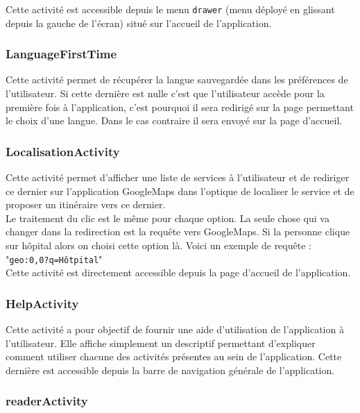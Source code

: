	Cette activité est accessible depuis le menu \texttt{drawer} (menu déployé en glissant depuis la gauche de l'écran) situé sur l'accueil de l'application.

\subsubsection{LanguageFirstTime}

	Cette activité permet de récupérer la langue sauvegardée dans les préférences de l'utilisateur. Si cette dernière est nulle c'est que l'utilisateur accède pour la première fois à l'application, c'est pourquoi il sera redirigé sur la page permettant le choix d'une langue. Dans le cas contraire il sera envoyé sur la page d'accueil.

\subsubsection{LocalisationActivity}
	
	Cette activité permet d'afficher une liste de services à l'utilisateur et de rediriger ce dernier sur l'application GoogleMaps dans l'optique de localiser le service et de proposer un itinéraire vers ce dernier.
	\\
	
	Le traitement du clic est le même pour chaque option. La seule chose qui va changer dans la redirection est la requête vers GoogleMaps. Si la personne clique sur hôpital alors on choisi cette option là. Voici un exemple de requête : "\texttt{geo:0,0?q=Hôtpital}"
	\\
	
	Cette activité est directement accessible depuis la page d'accueil de l'application.

\subsubsection{HelpActivity}

	Cette activité a pour objectif de fournir une aide d'utilisation de l'application à l'utilisateur. Elle affiche simplement un descriptif permettant d'expliquer comment utiliser chacune des activités présentes au sein de l'application. Cette dernière est accessible depuis la barre de navigation générale de l'application.

\subsubsection{readerActivity}
	
